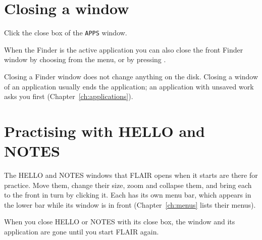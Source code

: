 \section{Closing a window}
\begin{TaskSteps}
\Step Click the close box of the \texttt{APPS} window.
\end{TaskSteps}

When the Finder is the active application you can also close the front
Finder window by choosing  from the 
menu, or by pressing .

Closing a Finder window does not change anything on the disk.  Closing a
window of an application usually ends the application; an application
with unsaved work asks you first (Chapter~\ref{ch:applications}).

\section{Practising with HELLO and NOTES}
The HELLO and NOTES windows that FLAIR opens when it starts are there for
practice.  Move them, change their size, zoom and collapse them, and bring
each to the front in turn by clicking it.  Each has its own menu bar, which
appears in the lower bar while its window is in front (Chapter~\ref{ch:menus} lists
their menus).

When you close HELLO or NOTES with its close box, the window and its
application are gone until you start FLAIR again.

